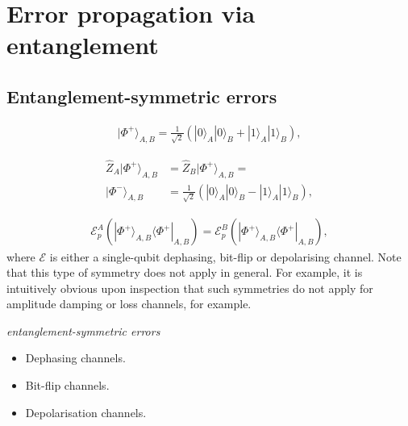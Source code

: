 \documentclass[aps,pra,twocolumn,amsmath,amssymb,nofootinbib,superscriptaddress]{revtex4}
\newcommand{\bra}[1]{\langle#1|}
\newcommand{\ket}[1]{|#1\rangle}
\begin{document}


%
%

\title{}

%
%

\author{Peter P. Rohde}

\frenchspacing

\maketitle

\section{Error propagation via entanglement}

\subsection{Entanglement-symmetric errors}

\begin{align}
	\ket{\Phi^+}_{A,B}=\frac{1}{\sqrt{2}}(\ket{0}_A\ket{0}_B + \ket{1}_A\ket{1}_B),
\end{align}

\begin{align}
	\hat{Z}_A \ket{\Phi^+}_{A,B} &= \hat{Z}_B \ket{\Phi^+}_{A,B} = \nonumber\\
	\ket{\Phi^-}_{A,B} &= \frac{1}{\sqrt{2}}(\ket{0}_A\ket{0}_B - \ket{1}_A\ket{1}_B),
\end{align}

\begin{align}
	\mathcal{E}^A_p(\ket{\Phi^+}_{A,B}\bra{\Phi^+}_{A,B}) = \mathcal{E}^B_p(\ket{\Phi^+}_{A,B}\bra{\Phi^+}_{A,B}),
\end{align}
where $\mathcal{E}$ is either a single-qubit dephasing, bit-flip or depolarising channel. Note that this type of symmetry does not apply in general. For example, it is intuitively obvious upon inspection that such symmetries do not apply for amplitude damping or loss channels, for example.

\textit{entanglement-symmetric errors}

\begin{itemize}
\item Dephasing channels.
\item Bit-flip channels.
\item Depolarisation channels.	
\end{itemize}
\end{document}
